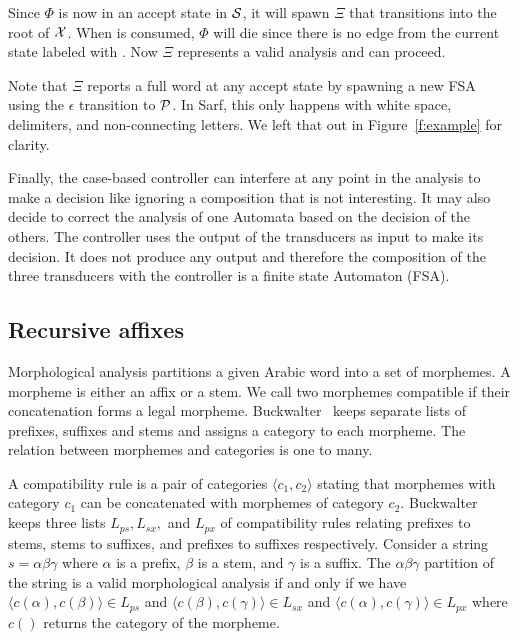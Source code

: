 \documentclass[11pt]{article}
\begin{document}
Since $\Phi$ is now in an accept state in ${\cal S}$, it will
spawn $\Xi$ that transitions into the root of ${\cal X}$. 
When  is consumed, $\Phi$ will die since 
there is no edge from the current state labeled with . 
Now $\Xi$ represents a valid analysis and can proceed.

Note that $\Xi$ reports a full word at any accept state
by spawning a new FSA using the $\epsilon$ transition
to ${\cal P}$.
In Sarf, this only happens with white space, delimiters, 
and non-connecting letters. 
We left that out in Figure~\ref{f:example} for clarity. 

Finally, the case-based controller can interfere at any point in the 
analysis to make a decision like ignoring a composition that 
is not interesting. 
It may also decide to correct the analysis of one Automata
based on the decision of the others. 
The controller uses the output of the transducers as input
to make its decision. 
It does not produce any output and therefore the composition
of the three transducers with the controller is a finite 
state Automaton (FSA). 

\subsection{Recursive affixes}
\label{sec:recaffix}

Morphological analysis partitions a given Arabic word
into a set of morphemes.
A morpheme is either an affix or a stem. 
We call two morphemes compatible if their concatenation
forms a legal morpheme. 
Buckwalter~ keeps separate lists 
of prefixes, suffixes and stems and assigns a category
to each morpheme. 
The relation between morphemes and categories is one 
to many. 

A compatibility rule is a pair of categories 
$\langle c_1, c_2\rangle$  stating that morphemes
with category $c_1$ can be concatenated with morphemes
of category $c_2$. 
Buckwalter keeps three lists $L_{ps}, L_{sx},$ and $L_{px}$ 
of compatibility rules relating
prefixes to stems, stems to suffixes, and prefixes to suffixes
respectively. 
Consider a string $s=\alpha\beta\gamma$ where $\alpha$ is 
a prefix, $\beta$ is a stem, and $\gamma$ is a suffix. 
The $\alpha\beta\gamma$ partition of the string is a 
valid morphological analysis if  and only if we have
$\langle c(\alpha),c(\beta)\rangle \in L_{ps}$ and
$\langle c(\beta),c(\gamma)\rangle \in L_{sx}$ and
$\langle c(\alpha),c(\gamma)\rangle \in L_{px}$ where
$c()$ returns the category of the morpheme.
\end{document}
